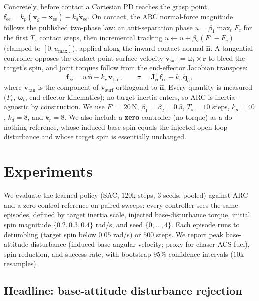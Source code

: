 \documentclass[conference]{IEEEtran}
\begin{document}
Concretely, before contact a Cartesian PD reaches the grasp point,
$\mathbf{f}_{\text{ee}} = k_p(\mathbf{x}_g - \mathbf{x}_{\text{ee}}) - k_d\dot{\mathbf{x}}_{\text{ee}}$.
On contact, the ARC normal-force magnitude follows the published two-phase law: an anti-separation
phase $u = \beta_1\max_t F_c$ for the first $T_s$ contact steps, then incremental tracking
$u \leftarrow u + \beta_2 (F^\star - F_c)$ (clamped to $[0, u_{\max}]$), applied along the inward
contact normal $\hat{\mathbf{n}}$. A tangential controller opposes the contact-point surface velocity
$\mathbf{v}_{\text{surf}} = \boldsymbol{\omega}_t \times \mathbf{r}$ to bleed the target's spin, and
joint torques follow from the end-effector Jacobian transpose:
\begin{equation}
\label{eq:arc}
\mathbf{f}_{\text{ee}} = u\,\hat{\mathbf{n}} - k_r\,\mathbf{v}_{\text{tan}}, \qquad
\boldsymbol{\tau} = \mathbf{J}_{\text{ee}}^{\top}\mathbf{f}_{\text{ee}} - k_v\,\dot{\mathbf{q}}_a,
\end{equation}
where $\mathbf{v}_{\text{tan}}$ is the component of $\mathbf{v}_{\text{surf}}$ orthogonal to
$\hat{\mathbf{n}}$. Every quantity is measured ($F_c$, $\boldsymbol{\omega}_t$, end-effector
kinematics); no target inertia enters, so ARC is inertia-agnostic by construction. We use
$F^\star=20$\,N, $\beta_1=\beta_2=0.5$, $T_s=10$ steps, $k_p=40$, $k_d=8$, and $k_r=8$.
We also include a \textbf{zero} controller (no torque) as a do-nothing reference, whose induced base
spin equals the injected open-loop disturbance and whose target spin is essentially unchanged.

\section{Experiments}

We evaluate the learned policy (SAC, $120$k steps, $3$ seeds, pooled) against ARC and a zero-control
reference on paired sweeps: every controller sees the same episodes, defined by target inertia scale,
injected base-disturbance torque, initial spin magnitude $\{0.2, 0.3, 0.4\}$ rad/s, and seed
$\{0,\dots,4\}$. Each episode runs to detumbling (target spin below $0.05$ rad/s) or $500$ steps. We
report peak base-attitude disturbance (induced base angular velocity; proxy for chaser ACS fuel),
spin reduction, and success rate, with bootstrap $95\%$ confidence intervals ($10$k resamples).

\subsection{Headline: base-attitude disturbance rejection}
\end{document}
